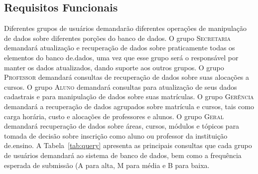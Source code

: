 \documentclass{article}
\begin{document}
\subsection{Requisitos Funcionais}
\label{sec:requisitosfuncionais}
Diferentes grupos de usu\'arios demandar\~ao diferentes opera\c{c}\~oes de manipula\c{c}\~ao de dados sobre diferentes por\c{c}\~oes do banco de dados. O grupo \textsc{Secretaria} demandar\'a atualiza\c{c}\~ao e recupera\c{c}\~ao de dados sobre praticamente todas os elementos do banco de.dados, uma vez que esse grupo ser\'a o respons\'avel por manter os dados atualizados, dando suporte aos outros grupos. O grupo \textsc{Professor} demandar\'a consultas de recupera\c{c}\~ao de dados sobre suas aloca\c{c}\~oes a cursos. O grupo \textsc{Aluno} demandar\'a consultas para atualiza\c{c}\~ao de seus dados cadastrais e para manipula\c{c}\~ao de dados sobre suas matr\'iculas. O grupo \textsc{Ger\^encia} demandar\'a a recupera\c{c}\~ao de dados agrupados sobre matr\'icula e cursos, tais como carga hor\'aria, custo e aloca\c{c}\~oes de professores e alunos. O grupo \textsc{Geral} demandar\'a recupera\c{c}\~ao de dados sobre \'areas, cursos, m\'odulos e t\'opicos para tomada de decis\~ao sobre inscri\c{c}\~ao como aluno ou professor da institui\c{c}\~ao de.ensino.
A Tabela~\ref{tab:query} apresenta as principais consultas que cada grupo de usu\'arios demandar\'a ao sistema de banco de dados, bem como a frequ\^encia esperada de submiss\~ao (A para alta, M para média e B para baixa.
\end{document}

